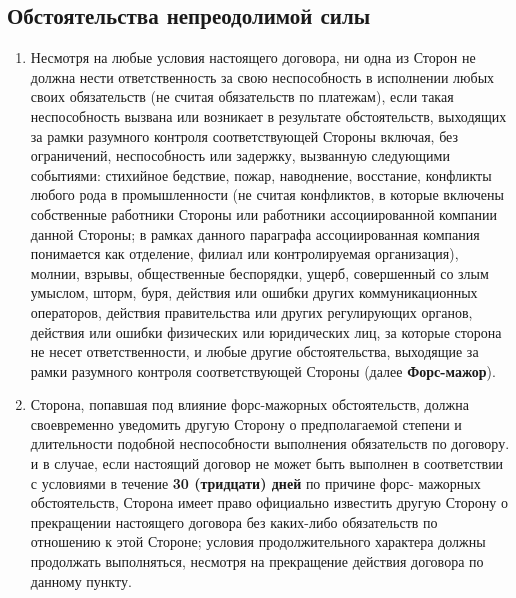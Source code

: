 \begin{Form}
    \section{Обстоятельства непреодолимой силы}\label{sec:10}
        \begin{enumerate}[label=\thesection.\arabic*.]
         \item  Несмотря на любые условия настоящего договора, ни одна из Сторон  не должна нести ответственность за свою
          неспособность в исполнении любых своих обязательств (не считая обязательств по платежам), если такая неспособность
          вызвана или возникает в результате обстоятельств, выходящих за рамки разумного контроля соответствующей Стороны включая,
          без ограничений, неспособность или задержку, вызванную следующими событиями: стихийное бедствие, пожар, наводнение, восстание,
          конфликты любого рода в промышленности (не считая конфликтов, в которые включены собственные работники Стороны  или
          работники ассоциированной компании данной Стороны; в рамках данного параграфа ассоциированная компания понимается
          как отделение, филиал или контролируемая организация), молнии, взрывы, общественные беспорядки, ущерб, совершенный со злым
          умыслом, шторм, буря, действия или ошибки других коммуникационных операторов, действия правительства или других
          регулирующих органов, действия или ошибки физических или юридических лиц, за которые сторона не несет ответственности, и
          любые другие обстоятельства, выходящие за рамки разумного контроля соответствующей Стороны (далее \textbf{\flqq{}Форс-мажор\frqq{}}).
          \item Сторона, попавшая под влияние форс-мажорных обстоятельств, должна своевременно уведомить другую Сторону о предполагаемой
           степени и длительности подобной неспособности выполнения обязательств по договору. и в случае, если настоящий
           договор не может быть выполнен в соответствии с условиями в течение \textbf{30 (тридцати) дней} по причине форс-
           мажорных обстоятельств, Сторона  имеет право официально известить другую Сторону о прекращении настоящего
           договора без каких-либо обязательств по отношению к этой Стороне; условия продолжительного характера должны
           продолжать выполняться, несмотря на прекращение действия договора по данному пункту.
           
        \end{enumerate}


\end{Form}
